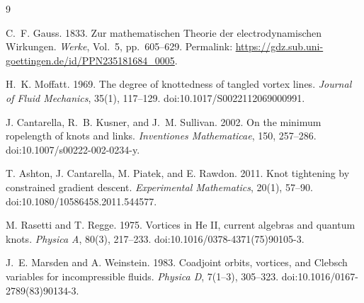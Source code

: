 \begin{thebibliography}{9}

C.~F. Gauss. 1833.
\newblock Zur mathematischen Theorie der electrodynamischen Wirkungen.
\newblock \emph{Werke}, Vol.~5, pp.~605--629.
\newblock Permalink: \url{https://gdz.sub.uni-goettingen.de/id/PPN235181684_0005}.

H.~K. Moffatt. 1969.
\newblock The degree of knottedness of tangled vortex lines.
\newblock \emph{Journal of Fluid Mechanics}, 35(1), 117--129.
\newblock doi:10.1017/S0022112069000991.

J. Cantarella, R.~B. Kusner, and J.~M. Sullivan. 2002.
\newblock On the minimum ropelength of knots and links.
\newblock \emph{Inventiones Mathematicae}, 150, 257--286.
\newblock doi:10.1007/s00222-002-0234-y.

T. Ashton, J. Cantarella, M. Piatek, and E. Rawdon. 2011.
\newblock Knot tightening by constrained gradient descent.
\newblock \emph{Experimental Mathematics}, 20(1), 57--90.
\newblock doi:10.1080/10586458.2011.544577.


M. Rasetti and T. Regge. 1975.
\newblock Vortices in He II, current algebras and quantum knots.
\newblock \emph{Physica A}, 80(3), 217--233.
\newblock doi:10.1016/0378-4371(75)90105-3.

J.~E. Marsden and A. Weinstein. 1983.
\newblock Coadjoint orbits, vortices, and Clebsch variables for incompressible fluids.
\newblock \emph{Physica D}, 7(1--3), 305--323.
\newblock doi:10.1016/0167-2789(83)90134-3.

\end{thebibliography}
